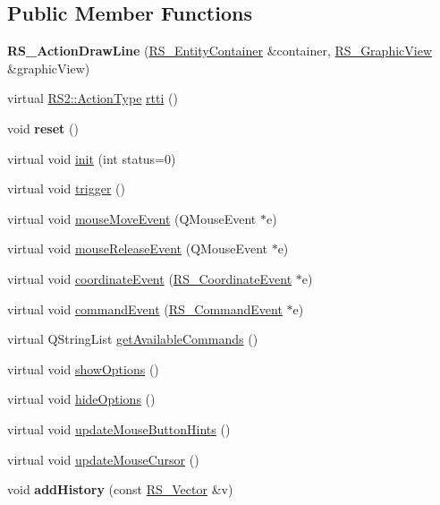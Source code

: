 \subsection*{Public Member Functions}
\begin{DoxyCompactItemize}
\item 
\hypertarget{classRS__ActionDrawLine_ad45aed244d8860880c56a7dde2101d57}{{\bfseries R\-S\-\_\-\-Action\-Draw\-Line} (\hyperlink{classRS__EntityContainer}{R\-S\-\_\-\-Entity\-Container} \&container, \hyperlink{classRS__GraphicView}{R\-S\-\_\-\-Graphic\-View} \&graphic\-View)}\label{classRS__ActionDrawLine_ad45aed244d8860880c56a7dde2101d57}

\item 
virtual \hyperlink{classRS2_afe3523e0bc41fd637b892321cfc4b9d7}{R\-S2\-::\-Action\-Type} \hyperlink{classRS__ActionDrawLine_ad722ae0b34543ec8512e9628fb1ececf}{rtti} ()
\item 
\hypertarget{classRS__ActionDrawLine_adaee4081ee86f4b5334bfaa02ad8c971}{void {\bfseries reset} ()}\label{classRS__ActionDrawLine_adaee4081ee86f4b5334bfaa02ad8c971}

\item 
virtual void \hyperlink{classRS__ActionDrawLine_a0a41c90d5af69657e724117dc83ed0a5}{init} (int status=0)
\item 
virtual void \hyperlink{classRS__ActionDrawLine_a5d7253adf5687be889ab7a86054afc95}{trigger} ()
\item 
virtual void \hyperlink{classRS__ActionDrawLine_a91fe5c78fd950ec873cfe33dbeb728f1}{mouse\-Move\-Event} (Q\-Mouse\-Event $\ast$e)
\item 
virtual void \hyperlink{classRS__ActionDrawLine_a381ffa498d9ac447ec0c5e6f562ac572}{mouse\-Release\-Event} (Q\-Mouse\-Event $\ast$e)
\item 
virtual void \hyperlink{classRS__ActionDrawLine_a514eeb713ef3742bd52517e067580bb9}{coordinate\-Event} (\hyperlink{classRS__CoordinateEvent}{R\-S\-\_\-\-Coordinate\-Event} $\ast$e)
\item 
virtual void \hyperlink{classRS__ActionDrawLine_aa9f05b60f364bc617ce062e8508a7537}{command\-Event} (\hyperlink{classRS__CommandEvent}{R\-S\-\_\-\-Command\-Event} $\ast$e)
\item 
virtual Q\-String\-List \hyperlink{classRS__ActionDrawLine_a24d5a8d5db7a062fc400cd6e6f1ee892}{get\-Available\-Commands} ()
\item 
virtual void \hyperlink{classRS__ActionDrawLine_ac467ba50bf704bcaa25fefb54bd29f65}{show\-Options} ()
\item 
virtual void \hyperlink{classRS__ActionDrawLine_a85f343abdac027db4526811312732d2b}{hide\-Options} ()
\item 
virtual void \hyperlink{classRS__ActionDrawLine_a283e7d3f2882a0643bace8807e8540a6}{update\-Mouse\-Button\-Hints} ()
\item 
virtual void \hyperlink{classRS__ActionDrawLine_a294c46c0f7fb6504e3c0c5fe6a695626}{update\-Mouse\-Cursor} ()
\item 
\hypertarget{classRS__ActionDrawLine_a726497520f56b54332598546742a4d46}{void {\bfseries add\-History} (const \hyperlink{classRS__Vector}{R\-S\-\_\-\-Vector} \&v)}\label{classRS__ActionDrawLine_a726497520f56b54332598546742a4d46}


\end{DoxyCompactItemize}
